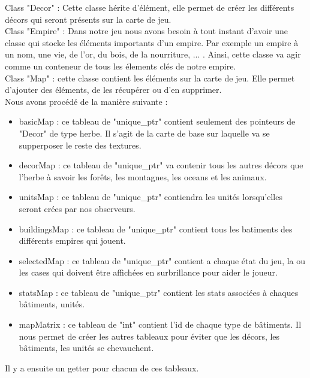 \documentclass[12pt,a4paper]{article}
\begin{document}
Class "Decor" : Cette classe hérite d'élément, elle permet de créer les différents décors qui seront présents sur la carte de jeu.\\ 

Class "Empire" : Dans notre jeu nous avons besoin à tout instant d'avoir une classe qui stocke les éléments importants d'un empire. Par exemple un empire à un nom, une vie, de l'or, du bois, de la nourriture, ... . Ainsi, cette classe va agir comme un conteneur de tous les élements clés de notre empire.\\

Class "Map" : cette classe contient les éléments sur la carte de jeu. Elle permet d'ajouter des éléments, de les récupérer ou d'en supprimer. \\Nous avons procédé de la manière suivante : \begin{itemize}
    \item basicMap : ce tableau de "unique\_ptr" contient seulement des pointeurs de "Decor" de type herbe. Il s'agit de la carte de base sur laquelle va se supperposer le reste des textures. 
    \item decorMap : ce tableau de "unique\_ptr" va contenir tous les autres décors que l'herbe à savoir les forêts, les montagnes, les oceans et les animaux. 
    \item unitsMap : ce tableau de "unique\_ptr" contiendra les unités lorsqu'elles seront crées par nos observeurs. 
    \item buildingsMap : ce tableau de "unique\_ptr" contient tous les batiments des différents empires qui jouent. 
    \item selectedMap : ce tableau de "unique\_ptr" contient a chaque état du jeu, la ou les cases qui doivent être affichées en surbrillance pour aider le joueur. 
    \item statsMap : ce tableau de "unique\_ptr" contient les stats associées à chaques bâtiments, unités. 
    \item mapMatrix : ce tableau de "int" contient l'id de chaque type de bâtiments. Il nous permet de créer les autres tableaux pour éviter que les décors, les bâtiments, les unités se chevauchent.
\end{itemize}
Il y a ensuite un getter pour chacun de ces tableaux. \\
\end{document}
